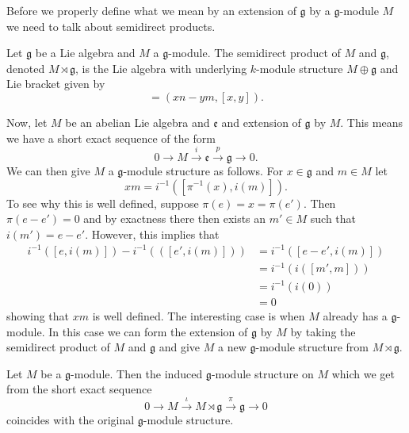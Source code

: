 Before we properly define what we mean by an extension of $ \mathfrak{g} $ by a $ \mathfrak{g} $-module $ M $ we need to talk about semidirect products.
\begin{definition}
  Let $ \mathfrak{g} $ be a Lie algebra and $ M $ a $ \mathfrak{g} $-module. The semidirect product of $ M $ and $ \mathfrak{g} $, denoted $ M \rtimes \mathfrak{g} $, is the Lie algebra with underlying $ k $-module structure $ M \oplus \mathfrak{g} $ and Lie bracket given by
  \begin{equation}
    [(m, x), (n, y)] = \left(xn - ym, [x, y]\right).
  \end{equation}
\end{definition}
Now, let $ M $ be an abelian Lie algebra and $ \mathfrak{e} $ and extension of $ \mathfrak{g} $ by $ M $. This means we have a short exact sequence of the form
\begin{equation}
  0 \to M \xrightarrow{i} \mathfrak{e} \xrightarrow{p} \mathfrak{g} \to 0.
\end{equation}
We can then give $ M $ a $ \mathfrak{g} $-module structure as follows. For $ x \in \mathfrak{g} $ and $ m \in M $ let
\begin{equation}
  xm = i^{-1}\left( [\pi^{-1}(x), i(m)] \right).
\end{equation}
To see why this is well defined, suppose $ \pi(e) = x = \pi(e') $. Then $ \pi(e - e') = 0 $ and by exactness there then exists an $ m' \in M $ such that $ i(m')=e - e' $. However, this implies that
\begin{align*}
  i^{-1}\left( [e, i(m)] \right) - i^{-1}(\left( [e', i(m)] \right)) &= i^{-1}\left( [e - e', i(m)] \right) \\
                                                                     &= i^{-1}(i([m', m])) \\
                                                                     &= i^{-1}(i(0)) \\
                                                                     &= 0
\end{align*}
showing that $ xm $ is well defined. The interesting case is when $ M $ already has a $ \mathfrak{g} $-module. In this case we can form the extension of $ \mathfrak{g} $ by $ M $ by taking the semidirect product of $ M $ and $ \mathfrak{g} $ and give $ M $ a new $ \mathfrak{g} $-module structure from $ M \rtimes \mathfrak{g} $.
\begin{lemma}
  Let $ M $ be a $ \mathfrak{g} $-module. Then the induced $ \mathfrak{g} $-module structure on $ M $ which we get from the short exact sequence
  \begin{equation}
    0 \to M \xrightarrow{\iota} M \rtimes \mathfrak{g} \xrightarrow{\pi} \mathfrak{g} \to 0
  \end{equation}
  coincides with the original $ \mathfrak{g} $-module structure.
\end{lemma}
